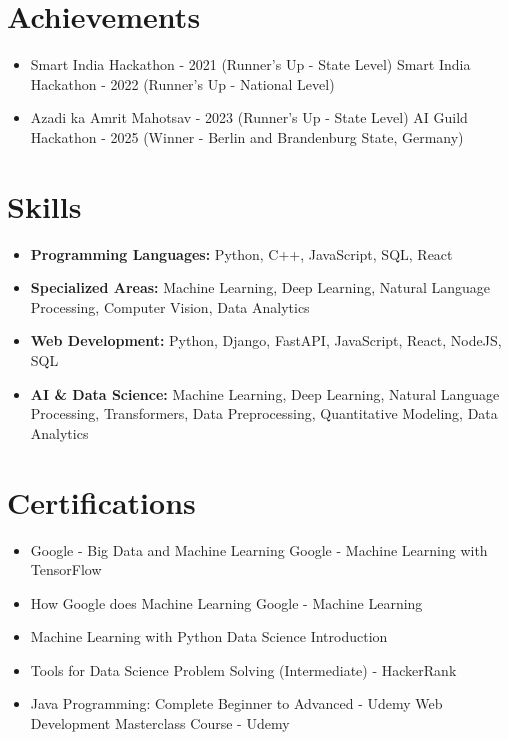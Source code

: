 \documentclass[a4paper,10pt]{article}
\begin{document}
\section*{Achievements}
\begin{itemize}
\item Smart India Hackathon - 2021 (Runner's Up - State Level) \hfill Smart India Hackathon - 2022 (Runner's Up - National Level)
\item Azadi ka Amrit Mahotsav - 2023 (Runner's Up - State Level) \hfill AI Guild Hackathon - 2025 (Winner - Berlin and Brandenburg State, Germany)
\end{itemize}

\section*{Skills}
\begin{itemize}
  \item \textbf{Programming Languages:} Python, C++, JavaScript, SQL, React
  \item \textbf{Specialized Areas:} Machine Learning, Deep Learning, Natural Language Processing, Computer Vision, Data Analytics
  \item \textbf{Web Development:} Python, Django, FastAPI, JavaScript, React, NodeJS, SQL
  \item \textbf{AI \& Data Science:} Machine Learning, Deep Learning, Natural Language Processing, Transformers, Data Preprocessing, Quantitative Modeling, Data Analytics
\end{itemize}

\section*{Certifications}
\begin{itemize}
\item Google - Big Data and Machine Learning \hfill Google - Machine Learning with TensorFlow
\item How Google does Machine Learning \hfill Google - Machine Learning
\item Machine Learning with Python \hfill Data Science Introduction
\item Tools for Data Science \hfill Problem Solving (Intermediate) - HackerRank
\item Java Programming: Complete Beginner to Advanced - Udemy \hfill Web Development Masterclass Course - Udemy
\end{itemize}
\end{document}
